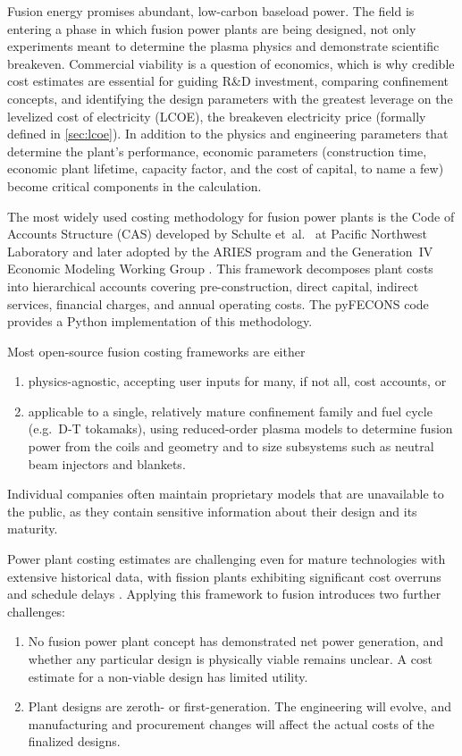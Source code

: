 \documentclass{article}
\begin{document}
Fusion energy promises abundant, low-carbon baseload power. The field is
entering a phase in which fusion power plants are being designed, not only
experiments meant to determine the plasma physics and demonstrate
scientific breakeven. Commercial viability is a question of economics, which is
why credible cost estimates are essential for guiding R\&D investment,
comparing confinement concepts, and identifying the design parameters
with the greatest leverage on the levelized cost of electricity
(LCOE), the breakeven electricity price (formally defined in
\cref{sec:lcoe}).
In addition to the physics and
engineering parameters that determine the plant's performance,
economic parameters (construction time, economic plant lifetime,
capacity factor, and the cost of capital, to name a few) become
critical components in the calculation.

The most widely used costing methodology for fusion power plants is the
Code of Accounts Structure (CAS) developed by Schulte et~al.\
\citep{schulte1978} at Pacific Northwest Laboratory and later adopted by
the ARIES program \citep{miller1998} and the Generation~IV Economic Modeling
Working Group \citep{emwg2007}. This framework decomposes plant costs into
hierarchical accounts covering pre-construction, direct capital, indirect
services, financial charges, and annual operating costs. The pyFECONS
code \citep{woodruff2026, woodruff2026b} provides a Python implementation of this
methodology.

Most open-source fusion costing frameworks are either
\begin{enumerate}
\item physics-agnostic, accepting user inputs for many, if not all, cost
  accounts, or
\item applicable to a single, relatively mature confinement family and fuel
  cycle (e.g.\ D-T tokamaks), using reduced-order plasma models to
  determine fusion power from the coils and geometry and to size subsystems
  such as neutral beam injectors and blankets.
\end{enumerate}
Individual companies often maintain proprietary models that are unavailable
to the public, as they contain sensitive information about their design and
its maturity.

Power plant costing estimates are challenging even for mature technologies
with extensive historical data, with fission plants exhibiting significant
cost overruns and schedule delays \citep{eashgates2020}. Applying this
framework to fusion introduces two further challenges:
\begin{enumerate}
\item No fusion power plant concept has demonstrated net power
  generation, and whether any particular design is physically
  viable remains unclear. A cost estimate for a non-viable design
  has limited utility.
\item Plant designs are zeroth- or first-generation. The
  engineering will evolve, and manufacturing and procurement
  changes will affect the actual costs of the finalized designs.
\end{enumerate}
\end{document}
